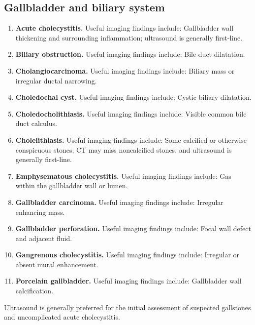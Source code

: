 \subsection{Gallbladder and biliary system}
\begin{enumerate}[leftmargin=*,itemsep=0.45em,topsep=0.4em]
\item \textbf{Acute cholecystitis.} Useful imaging findings include: Gallbladder wall thickening and surrounding inflammation; ultrasound is generally first-line.
\item \textbf{Biliary obstruction.} Useful imaging findings include: Bile duct dilatation.
\item \textbf{Cholangiocarcinoma.} Useful imaging findings include: Biliary mass or irregular ductal narrowing.
\item \textbf{Choledochal cyst.} Useful imaging findings include: Cystic biliary dilatation.
\item \textbf{Choledocholithiasis.} Useful imaging findings include: Visible common bile duct calculus.
\item \textbf{Cholelithiasis.} Useful imaging findings include: Some calcified or otherwise conspicuous stones; CT may miss noncalcified stones, and ultrasound is generally first-line.
\item \textbf{Emphysematous cholecystitis.} Useful imaging findings include: Gas within the gallbladder wall or lumen.
\item \textbf{Gallbladder carcinoma.} Useful imaging findings include: Irregular enhancing mass.
\item \textbf{Gallbladder perforation.} Useful imaging findings include: Focal wall defect and adjacent fluid.
\item \textbf{Gangrenous cholecystitis.} Useful imaging findings include: Irregular or absent mural enhancement.
\item \textbf{Porcelain gallbladder.} Useful imaging findings include: Gallbladder wall calcification.
\end{enumerate}

Ultrasound is generally preferred for the initial assessment of suspected gallstones and uncomplicated acute cholecystitis.

